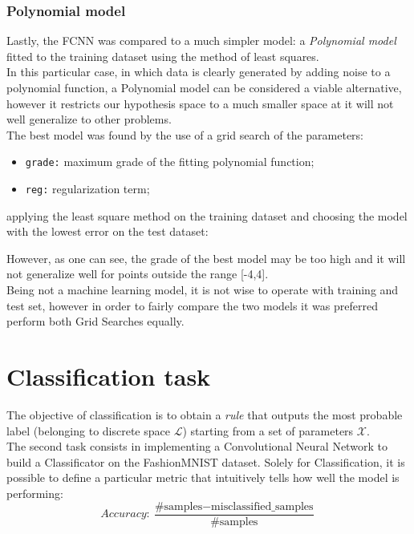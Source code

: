 \documentclass[11pt,a4paper,twocolumn]{IEEEtran}
\begin{document}
				\subsubsection{Polynomial model}
					Lastly, the FCNN was compared to a much simpler model: a \textit{Polynomial model} fitted to the training dataset using the method of least squares.\\
					In this particular case, in which data is clearly generated by adding noise to a polynomial function, a Polynomial model can be considered a viable alternative, however it restricts our hypothesis space to a much smaller space at it will not well generalize to other problems.\medskip\\
					The best model was found by the use of a grid search of the parameters:
					\begin{itemize}
						\item \texttt{grade:} maximum grade of the fitting polynomial function;
						\item \texttt{reg:} regularization term;
					\end{itemize}
					applying the least square method on the training dataset and choosing the model with the lowest error on the test dataset:\newpage
					\begin{figure}[h]
						\centering
						
					\end{figure}
					However, as one can see, the grade of the best model may be too high and it will not generalize well for points outside the range [-4,4].\medskip\\
					Being not a machine learning model, it is not wise to operate with training and test set, however in order to fairly compare the two models it was preferred perform both Grid Searches equally.
	\section{\textbf{Classification task}}
		The objective of classification is to obtain a \textit{rule} that outputs the most probable label (belonging to discrete space $\mathcal{L}$) starting from a set of parameters $\mathcal{X}$.\medskip\\
		The second task consists in implementing a Convolutional Neural Network to build a Classificator on the FashionMNIST dataset\cite{xiao2017fashion}.
		Solely for Classification, it is possible to define a particular metric that intuitively tells how well the model is performing:
		$$Accuracy: \frac{\text{\#samples} - \text{misclassified\_samples}}{\text{\#samples}}$$
\end{document}
